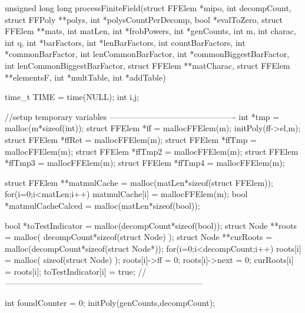 \begin{ccode}[caption={Aus \url{../Sage/enumeratePCNs.c}},
  firstnumber=1173, label=lst:processFiniteField]
unsigned long long processFiniteField(struct FFElem *mipo, int decompCount,
        struct FFPoly **polys, int *polysCountPerDecomp,
        bool *evalToZero, 
        struct FFElem **mats, int matLen, int *frobPowers,
        int *genCounts, int m, int charac, int q,
        int *barFactors, int *lenBarFactors, int countBarFactors,
        int *commonBarFactor, int lenCommonBarFactor,
        int *commonBiggestBarFactor, int lenCommonBiggestBarFactor,
        struct FFElem **matCharac, struct FFElem **elementsF,
        int *multTable, int *addTable){
    time_t TIME = time(NULL);
    int i,j;

    //setup temporary variables ----------------------------------------------
    int *tmp = malloc(m*sizeof(int));
    struct FFElem *ff = mallocFFElem(m);
    initPoly(ff->el,m);
    struct FFElem *ffRet = mallocFFElem(m);
    struct FFElem *ffTmp = mallocFFElem(m);
    struct FFElem *ffTmp2 = mallocFFElem(m);
    struct FFElem *ffTmp3 = mallocFFElem(m);
    struct FFElem *ffTmp4 = mallocFFElem(m);
    
    struct FFElem **matmulCache = malloc(matLen*sizeof(struct FFElem));
    for(i=0;i<matLen;i++) matmulCache[i] = mallocFFElem(m);
    bool *matmulCacheCalced = malloc(matLen*sizeof(bool));
    
    bool *toTestIndicator = malloc(decompCount*sizeof(bool));
    struct Node **roots = malloc( decompCount*sizeof(struct Node) );
    struct Node **curRoots = malloc(decompCount*sizeof(struct Node*));
    for(i=0;i<decompCount;i++){
        roots[i] = malloc( sizeof(struct Node) );
        roots[i]->ff = 0;
        roots[i]->next = 0;
        curRoots[i] = roots[i];
        toTestIndicator[i] = true;
    }
    //------------------------------------------------------------------------
    
    int foundCounter = 0;
    initPoly(genCounts,decompCount);

}
\end{ccode}
